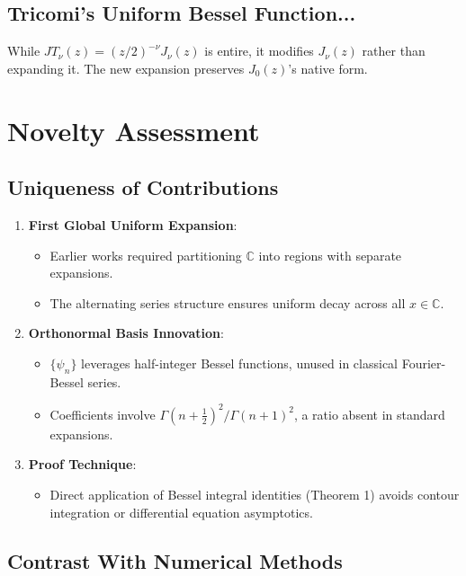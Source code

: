 \documentclass{article}
\begin{document}
\subsection*{Tricomi's Uniform Bessel Function...}
While $JT_\nu(z) = (z/2)^{-\nu} J_\nu(z)$ is entire, it modifies $J_\nu(z)$ rather than expanding it. The new expansion preserves $J_0(z)$'s native form.

\section*{Novelty Assessment}

\subsection*{Uniqueness of Contributions}

\begin{enumerate}
    \item \textbf{First Global Uniform Expansion}:
    \begin{itemize}
        \item Earlier works required partitioning $\mathbb{C}$ into regions with separate expansions.
        \item The alternating series structure ensures uniform decay across all $x \in \mathbb{C}$.
    \end{itemize}
    
    \item \textbf{Orthonormal Basis Innovation}:
    \begin{itemize}
        \item $\{\psi_n\}$ leverages half-integer Bessel functions, unused in classical Fourier-Bessel series.
        \item Coefficients involve $\Gamma(n + \frac{1}{2})^2 / \Gamma(n + 1)^2$, a ratio absent in standard expansions.
    \end{itemize}
    
    \item \textbf{Proof Technique}:
    \begin{itemize}
        \item Direct application of Bessel integral identities (Theorem 1) avoids contour integration or differential equation asymptotics.
    \end{itemize}
\end{enumerate}

\subsection*{Contrast With Numerical Methods}
\end{document}
